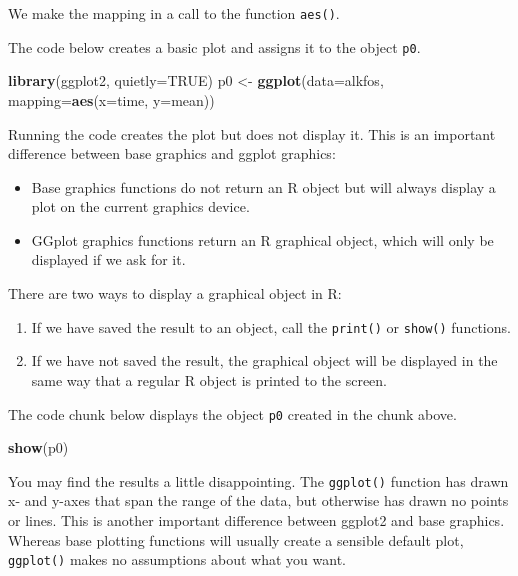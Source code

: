 \documentclass[
]{book}
\newenvironment{Shaded}{\begin{snugshade}}{\end{snugshade}}
\newcommand{\AttributeTok}[1]{\textcolor[rgb]{0.13,0.29,0.53}{#1}}
\newcommand{\ConstantTok}[1]{\textcolor[rgb]{0.56,0.35,0.01}{#1}}
\newcommand{\FunctionTok}[1]{\textcolor[rgb]{0.13,0.29,0.53}{\textbf{#1}}}
\newcommand{\NormalTok}[1]{#1}
\newcommand{\OtherTok}[1]{\textcolor[rgb]{0.56,0.35,0.01}{#1}}
\providecommand{\tightlist}{%
  \setlength{\itemsep}{0pt}\setlength{\parskip}{0pt}}
\begin{document}
We make the mapping in a call to the function \texttt{aes()}.

The code below creates a basic plot and assigns it to the object \texttt{p0}.

\begin{Shaded}
\begin{Highlighting}[]
\FunctionTok{library}\NormalTok{(ggplot2, }\AttributeTok{quietly=}\ConstantTok{TRUE}\NormalTok{)}
\NormalTok{p0 }\OtherTok{\textless{}{-}} \FunctionTok{ggplot}\NormalTok{(}\AttributeTok{data=}\NormalTok{alkfos, }\AttributeTok{mapping=}\FunctionTok{aes}\NormalTok{(}\AttributeTok{x=}\NormalTok{time, }\AttributeTok{y=}\NormalTok{mean))}
\end{Highlighting}
\end{Shaded}

Running the code creates the plot but does not display it. This is an important difference between base graphics and ggplot graphics:

\begin{itemize}
\tightlist
\item
  Base graphics functions do not return an R object but will always display a plot on the current graphics device.
\item
  GGplot graphics functions return an R graphical object, which will only be displayed if we ask for it.
\end{itemize}

There are two ways to display a graphical object in R:

\begin{enumerate}
\def\labelenumi{\arabic{enumi}.}
\tightlist
\item
  If we have saved the result to an object, call the \texttt{print()} or \texttt{show()} functions.
\item
  If we have not saved the result, the graphical object will be displayed in the same way that a regular R object is printed to the screen.
\end{enumerate}

The code chunk below displays the object \texttt{p0} created in the chunk above.

\begin{Shaded}
\begin{Highlighting}[]
\FunctionTok{show}\NormalTok{(p0)}
\end{Highlighting}
\end{Shaded}

You may find the results a little disappointing. The \texttt{ggplot()} function has drawn x- and y-axes that span the range of the data, but otherwise has drawn no points or lines. This is another important difference between ggplot2 and base graphics. Whereas base plotting functions will usually create a sensible default plot, \texttt{ggplot()} makes no assumptions about what you want.
\end{document}
